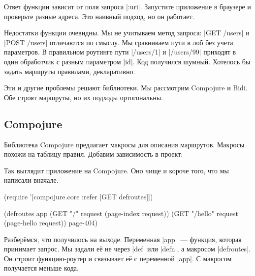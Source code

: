 Ответ функции зависит от поля запроса \spverb|:uri|. Запустите приложение в
браузере и проверьте разные адреса. Это наивный подход, но он работает.

Недостатки функции очевидны. Мы не учитываем метод запроса: \spverb|GET /users|
и \spverb|POST /users| отличаются по смыслу. Мы сравниваем пути в лоб без учета
параметров. В правильном роутинге пути \spverb|/users/1| и \spverb|/users/99|
приходят в один обработчик с разным параметром \spverb|id|. Код получился
шумный. Хотелось бы задать маршруты правилами, декларативно.

Эти и другие проблемы решают библиотеки. Мы рассмотрим Compojure и Bidi. Обе
строят маршруты, но их подходы ортогональны.

\subsection{Compojure}

\label{compojure}


Библиотека Compojure
предлагает макросы для описания маршрутов. Макросы похожи на таблицу правил.
Добавим зависимость в проект:

\begin{english}
  \begin{clojure}
[compojure "1.6.1"]
  \end{clojure}
\end{english}

Так выглядит приложение на Compojure. Оно чище и короче того, что мы написали
вначале.


\begin{english}
  \begin{clojure}
(require '[compojure.core :refer [GET defroutes]])

(defroutes app
  (GET "/"      request (page-index request))
  (GET "/hello" request (page-hello request))
  page-404)
  \end{clojure}
\end{english}

Разбер\"{е}мся, что получилось на выходе. Переменная \spverb|app|~--- функция,
которая принимает запрос. Мы задали е\"{е} не через \spverb|def| или \spverb|defn|,
а макросом \spverb|defroutes|. Он строит функцию-роутер и связывает е\"{е} с
переменной \spverb|app|. С макросом получается меньше кода.

